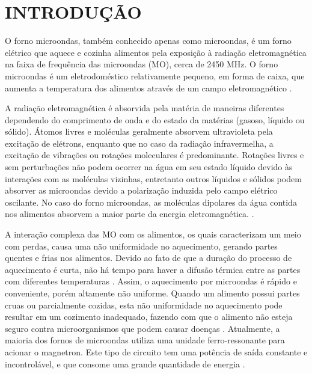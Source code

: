 \setcounter{page}{11}

\chapter{INTRODUÇÃO}
\label{chap:introducao}


O forno microondas, também conhecido apenas como microondas, é um forno elétrico que aquece e cozinha alimentos pela exposição à radiação eletromagnética na faixa de frequência das microondas (MO), cerca de 2450 MHz. O forno microondas é um eletrodoméstico relativamente pequeno, em forma de caixa, que aumenta a temperatura dos alimentos através de um campo eletromagnético \cite{MicrowaveBritannica}. 

A radiação eletromagnética é absorvida pela matéria de maneiras diferentes dependendo do comprimento de onda e do estado da matérias (gasoso, líquido ou sólido). Átomos livres e moléculas geralmente absorvem ultravioleta pela excitação de elétrons, enquanto que no caso da radiação infravermelha, a excitação de vibrações ou rotações moleculares é predominante. Rotações livres e sem perturbações não podem ocorrer na água em seu estado líquido devido às interações com as moléculas vizinhas,  entretanto outros líquidos e sólidos podem absorver as microondas devido a polarização induzida pelo campo elétrico oscilante. No caso do forno microondas, as moléculas dipolares da água contida nos alimentos absorvem a maior parte da energia eletromagnética. \cite{Vollmer}.

A interação complexa das MO com os alimentos, os quais caracterizam um meio com perdas, causa uma não uniformidade no aquecimento, gerando partes quentes e frias nos alimentos. Devido ao fato de que a duração do processo de aquecimento é curta, não há tempo para haver a difusão térmica entre as partes com diferentes temperaturas \cite{Ma}. Assim, o aquecimento por microondas é rápido e conveniente, porém altamente não uniforme. Quando um alimento possui partes cruas ou parcialmente cozidas, esta não uniformidade no aquecimento pode resultar em um cozimento inadequado, fazendo com que o alimento não esteja seguro contra microorganismos que podem causar doenças \cite{Pitchai2011}. Atualmente, a maioria dos fornos de microondas utiliza uma unidade ferro-ressonante para acionar o magnetron. Este tipo de circuito tem uma potência de saída constante e incontrolável, e que consome uma grande quantidade de energia \cite{Hidenori1991}.


